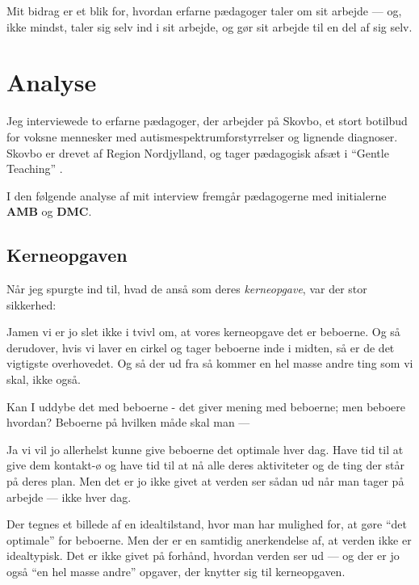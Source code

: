 Mit bidrag er et blik for, hvordan erfarne pædagoger taler om sit arbejde — og, ikke mindst, taler sig selv ind i sit arbejde, og gør sit arbejde til en del af sig selv.

\section{Analyse}

Jeg interviewede to erfarne pædagoger, der arbejder på Skovbo, et stort botilbud for voksne mennesker med autismespektrumforstyrrelser og lignende diagnoser.
Skovbo er drevet af Region Nordjylland, og tager pædagogisk afsæt i 
“Gentle Teaching” \autocite{sodisbakkeAutismespektrumforstyrrelser2019}.

I den følgende analyse af mit interview fremgår pædagogerne med initialerne \textbf{AMB} og \textbf{DMC}.

\subsection{Kerneopgaven}

Når jeg spurgte ind til, hvad de anså som deres \textit{kerneopgave}, var der stor sikkerhed:
\begin{description}
\DMC Jamen vi er jo slet ikke i tvivl om, at vores kerneopgave det er beboerne.
Og så derudover, hvis vi laver en cirkel og tager beboerne inde i midten, så er de det vigtigste overhovedet.
Og så der ud fra så kommer en hel masse andre ting som vi skal, ikke også.

\MAA
Kan I uddybe det med beboerne - det giver mening med beboerne; men beboere hvordan? Beboerne på hvilken måde skal man — 

\AMB
Ja vi vil jo allerhelst kunne give beboerne det optimale hver dag. Have tid til at give dem kontakt-ø og have tid til at nå alle deres aktiviteter og de ting der står på deres plan. Men det er jo ikke givet at verden ser sådan ud når man tager på arbejde — ikke hver dag.
\end{description}

Der tegnes et billede af en idealtilstand, hvor man har mulighed for, at gøre “det optimale” for beboerne.
Men der er en samtidig anerkendelse af, at verden ikke er idealtypisk.
Det er ikke givet på forhånd, hvordan verden ser ud — og der er jo også “en hel masse andre” opgaver, der knytter sig til kerneopgaven.

